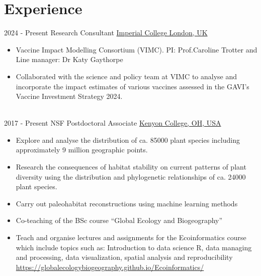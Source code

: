 \documentclass[icon]{twentysecondcv} %
\begin{document}
\makeprofile %


\section{Experience}

\begin{twenty} %

 \twentyitem
    	{2024 - }
		{Present}
        {Research Consultant}
        {\href{https://www.vaccineimpact.org/}{Imperial College London, UK}}
         {}
         {\begin{itemize}
         \item Vaccine Impact Modelling Consortium (VIMC). PI: Prof.Caroline Trotter and Line manager: Dr Katy Gaythorpe
         \item Collaborated with the science and policy team at VIMC to analyse and incorporate the impact estimates of various vaccines assessed in the GAVI's Vaccine Investment Strategy 2024.
         \end{itemize}}
         \\
	\twentyitem
    	{2017 -}
		{Present}
        {NSF Postdoctoral Associate}
        {\href{https://www.kenyon.edu}{Kenyon College, OH, USA}}
        {}
        {
        {\begin{itemize}
        \item Explore and analyse the distribution of ca. 85000 plant species including approximately 9 million geographic points. 
        \item Research the consequences of habitat stability on current patterns of plant diversity using the distribution and phylogenetic relationships of ca. 24000 plant species. 
        \item Carry out paleohabitat reconstructions using machine learning methods
        \item Co-teaching of the BSc course ``Global Ecology and Biogeography'' 
        \item Teach and organise lectures and assignments for the Ecoinformatics course which include topics such as: 
        Introduction to data science R, data managing and processing, data visualization, spatial analysis and reproducibility \url{https://globalecologybiogeography.github.io/Ecoinformatics/}		
    \end{itemize}}
        }
    \\   




\end{twenty}
\end{document}
